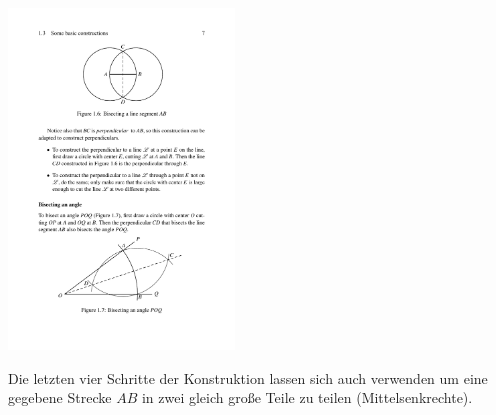 


\centerline{\includegraphics[width=6cm]{BILDER/BildKonstruktionStreckenhalbierung.pdf}}


Die letzten vier Schritte der Konstruktion lassen sich auch
verwenden um eine gegebene Strecke $AB$ in zwei gleich große Teile zu
teilen (Mittelsenkrechte).




